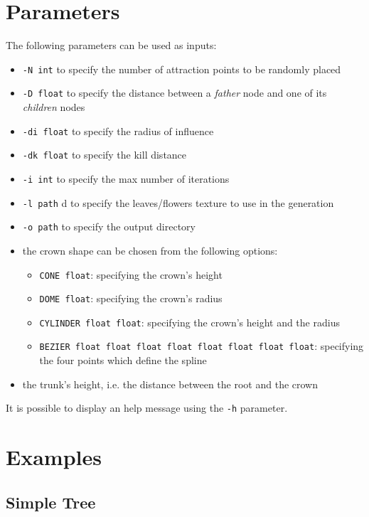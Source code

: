 \documentclass[10pt,a4paper]{article}
\begin{document}
\section{Parameters}

The following parameters can be used as inputs:
\begin{itemize}
	\item \texttt{-N int} to specify the number of attraction points to be randomly placed
	\item \texttt{-D float} to specify the distance between a \textit{father} node and one of its \textit{children} nodes
	\item \texttt{-di float} to specify the radius of influence
	\item \texttt{-dk float} to specify the kill distance
	\item \texttt{-i int} to specify the max number of iterations
	\item \texttt{-l path} d to specify the leaves/flowers texture to use in the generation
	\item \texttt{-o path} to specify the output directory
	\item the crown shape can be chosen from the following options:
    	\begin{itemize}
    		\item \texttt{CONE float}: specifying the crown's height
    		\item \texttt{DOME float}: specifying the crown's radius
    		\item \texttt{CYLINDER float float}: specifying the crown's height and the radius
    		\item \texttt{BEZIER float float float float float float float float}: specifying the four points which define the spline
    	\end{itemize}
	\item the trunk's height, i.e. the distance between the root and the crown
\end{itemize}

It is possible to display an help message using the \texttt{-h} parameter.

\section{Examples}

\subsection{Simple Tree}
\end{document}
